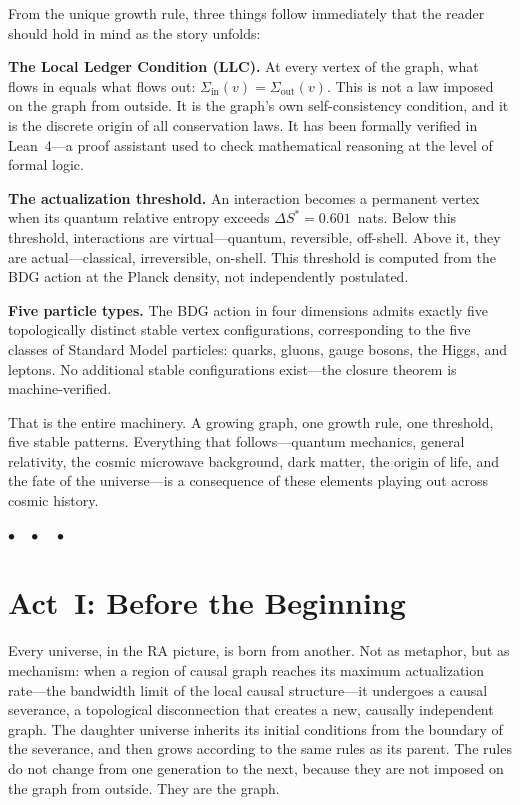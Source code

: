 \documentclass[12pt,a4paper]{article}
\begin{document}
From the unique growth rule, three things follow immediately that the reader should hold in mind as the story unfolds:

\textbf{The Local Ledger Condition (LLC).} At every vertex of the graph, what flows in equals what flows out: $\Sigma_{\mathrm{in}}(v) = \Sigma_{\mathrm{out}}(v)$. This is not a law imposed on the graph from outside. It is the graph's own self-consistency condition, and it is the discrete origin of all conservation laws. It has been formally verified in Lean~4---a proof assistant used to check mathematical reasoning at the level of formal logic.

\textbf{The actualization threshold.} An interaction becomes a permanent vertex when its quantum relative entropy exceeds $\Delta S^* = 0.601$~nats. Below this threshold, interactions are virtual---quantum, reversible, off-shell. Above it, they are actual---classical, irreversible, on-shell. This threshold is computed from the BDG action at the Planck density, not independently postulated.

\textbf{Five particle types.} The BDG action in four dimensions admits exactly five topologically distinct stable vertex configurations, corresponding to the five classes of Standard Model particles: quarks, gluons, gauge bosons, the Higgs, and leptons. No additional stable configurations exist---the closure theorem is machine-verified.

That is the entire machinery. A growing graph, one growth rule, one threshold, five stable patterns. Everything that follows---quantum mechanics, general relativity, the cosmic microwave background, dark matter, the origin of life, and the fate of the universe---is a consequence of these elements playing out across cosmic history.

\bigskip\begin{center}$\bullet\quad\bullet\quad\bullet$\end{center}\bigskip

\section{Act~I: Before the Beginning}

Every universe, in the RA picture, is born from another. Not as metaphor, but as mechanism: when a region of causal graph reaches its maximum actualization rate---the bandwidth limit of the local causal structure---it undergoes a causal severance, a topological disconnection that creates a new, causally independent graph. The daughter universe inherits its initial conditions from the boundary of the severance, and then grows according to the same rules as its parent. The rules do not change from one generation to the next, because they are not imposed on the graph from outside. They are the graph.
\end{document}
